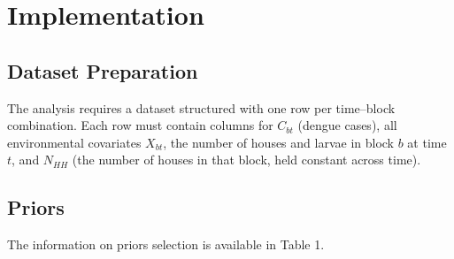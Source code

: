 \documentclass[12pt,a4paper]{article}
\begin{document}
\section{Implementation}

\subsection{Dataset Preparation}

The analysis requires a dataset structured with one row per time--block combination. Each row must contain columns for $C_{bt}$ (dengue cases), all environmental covariates $X_{bt}$, the number of houses and larvae in block $b$ at time $t$, and $N_{HH}$ (the number of houses in that block, held constant across time).

\subsection{Priors}
The information on priors selection is available in Table 1. 
\end{document}
